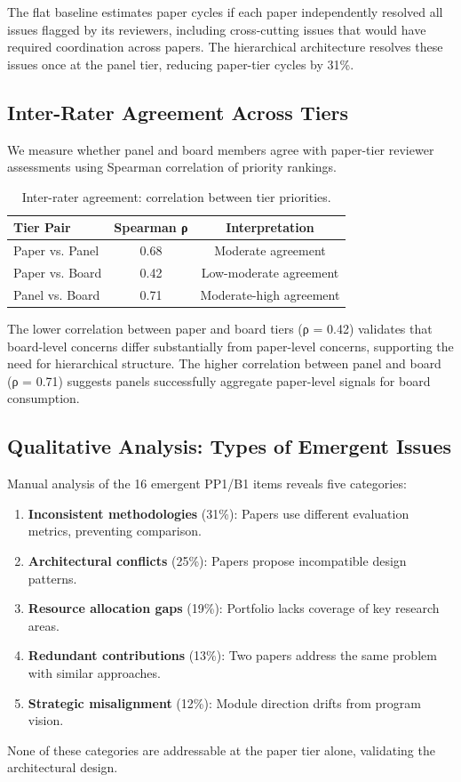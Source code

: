 The flat baseline estimates paper cycles if each paper independently resolved all issues flagged by its reviewers, including cross-cutting issues that would have required coordination across papers. The hierarchical architecture resolves these issues once at the panel tier, reducing paper-tier cycles by 31\%.

\subsection{Inter-Rater Agreement Across Tiers}

We measure whether panel and board members agree with paper-tier reviewer assessments using Spearman correlation of priority rankings.

\begin{table}[t]
\centering
\caption{Inter-rater agreement: correlation between tier priorities.}
\label{tab:agreement}
\begin{tabular}{lcc}
\toprule
Tier Pair & Spearman ρ & Interpretation \\
\midrule
Paper vs. Panel & 0.68 & Moderate agreement \\
Paper vs. Board & 0.42 & Low-moderate agreement \\
Panel vs. Board & 0.71 & Moderate-high agreement \\
\bottomrule
\end{tabular}
\end{table}

The lower correlation between paper and board tiers (ρ = 0.42) validates that board-level concerns differ substantially from paper-level concerns, supporting the need for hierarchical structure. The higher correlation between panel and board (ρ = 0.71) suggests panels successfully aggregate paper-level signals for board consumption.

\subsection{Qualitative Analysis: Types of Emergent Issues}

Manual analysis of the 16 emergent PP1/B1 items reveals five categories:

\begin{enumerate}
\item \textbf{Inconsistent methodologies} (31\%): Papers use different evaluation metrics, preventing comparison.
\item \textbf{Architectural conflicts} (25\%): Papers propose incompatible design patterns.
\item \textbf{Resource allocation gaps} (19\%): Portfolio lacks coverage of key research areas.
\item \textbf{Redundant contributions} (13\%): Two papers address the same problem with similar approaches.
\item \textbf{Strategic misalignment} (12\%): Module direction drifts from program vision.
\end{enumerate}

None of these categories are addressable at the paper tier alone, validating the architectural design.